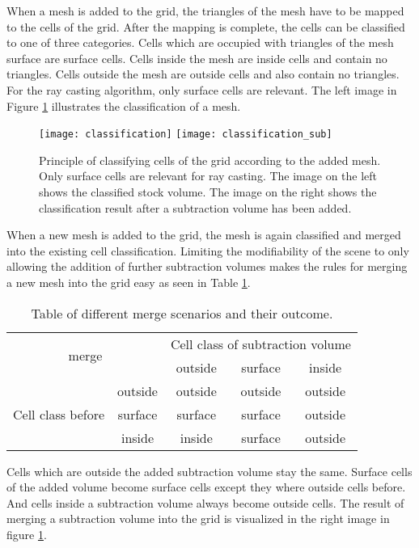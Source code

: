 When a mesh is added to the grid, the triangles of the mesh have to be mapped to the cells of the grid. After the mapping is complete, the cells can be classified to one of three categories. Cells which are occupied with triangles of the mesh surface are surface cells. Cells inside the mesh are inside cells and contain no triangles. Cells outside the mesh are outside cells and also contain no triangles. For the ray casting algorithm, only surface cells are relevant. The left image in Figure \ref{fig:classification} illustrates the classification of a mesh.

\begin{figure}
\centering
\texttt{[image: classification]}
\texttt{[image: classification\_sub]}
\caption{Principle of classifying cells of the grid according to the added mesh. Only surface cells are relevant for ray casting. The image on the left shows the classified stock volume. The image on the right shows the classification result after a subtraction volume has been added.}
\label{fig:classification}
\end{figure}

When a new mesh is added to the grid, the mesh is again classified and merged into the existing cell classification. Limiting the modifiability of the scene to only allowing the addition of further subtraction volumes makes the rules for merging a new mesh into the grid easy as seen in Table \ref{tbl:classification_rules}.

\begin{table}[h]
\centering
\begin{tabular}{|c|c|c|c|c|}
\hline
\multicolumn{2}{|c|}{\multirow{2}{*}{merge}} & \multicolumn{3}{c|}{Cell class of subtraction volume} \\
\cline{3-5}
\multicolumn{2}{|c|}{} & outside & surface & inside \\
 \hline
\multirow{3}{*}{Cell class before} & outside & outside & outside & outside \\
\cline{2-5}
 & surface & surface & surface & outside \\
\cline{2-5}
 & inside & inside & surface & outside \\
\hline
\end{tabular}
\caption{Table of different merge scenarios and their outcome.}
\label{tbl:classification_rules}
\end{table}

Cells which are outside the added subtraction volume stay the same. Surface cells of the added volume become surface cells except they where outside cells before. And cells inside a subtraction volume always become outside cells. The result of merging a subtraction volume into the grid is visualized in the right image in figure \ref{fig:classification}.


